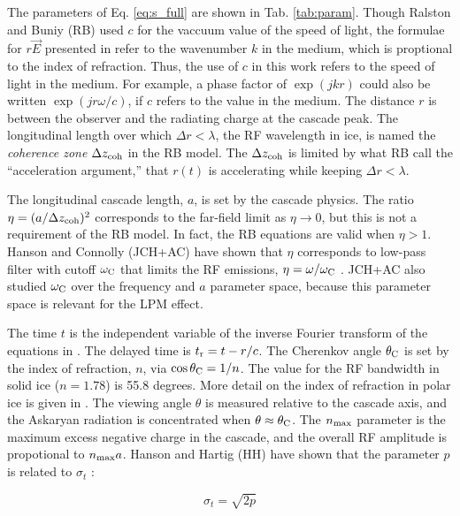 \documentclass[amsmath,amssymb,aps,prd,10pt,twocolumn,showkeys]{revtex4}
\begin{document}
\begin{itemize}
The parameters of Eq. \ref{eq:s_full} are shown in Tab. \ref{tab:param}.  Though Ralston and Buniy (RB) \cite{10.1103/physrevd.65.016003} used $c$ for the vaccuum value of the speed of light, the formulae for $r \vec{E}$ presented in \cite{10.1103/physrevd.65.016003} refer to the wavenumber $k$ in the medium, which is proptional to the index of refraction. Thus, the use of $c$ in this work refers to the speed of light in the medium.  For example, a phase factor of $\exp(j k r)$ could also be written $\exp(j r \omega/c)$, if $c$ refers to the value in the medium.  The distance $r$ is between the observer and the radiating charge at the cascade peak.  The longitudinal length over which $\Delta r < \lambda$, the RF wavelength in ice, is named the \textit{coherence zone} $\Delta z_{\rm coh}$ in the RB model.  The $\Delta z_{\rm coh}$ is limited by what RB call the ``acceleration argument,'' that $r(t)$ is accelerating while keeping $\Delta r < \lambda$.

The longitudinal cascade length, $a$, is set by the cascade physics.  The ratio $\eta = (a/\Delta z_{\rm coh})^2$ corresponds to the far-field limit as $\eta \to 0$, but this is not a requirement of the RB model.  In fact, the RB equations are valid when $\eta > 1$.  Hanson and Connolly (JCH+AC) have shown that $\eta$ corresponds to low-pass filter with cutoff $\omega_{\rm C}$ that limits the RF emissions, $\eta = \omega/\omega_{\rm C}$ \cite{10.1016/j.astropartphys.2017.03.008}.  JCH+AC also studied $\omega_{\rm C}$ over the frequency and $a$ parameter space, because this parameter space is relevant for the LPM effect.

The time $t$ is the independent variable of the inverse Fourier transform of the equations in \cite{10.1103/physrevd.65.016003}. The delayed time is $t_{\rm r} = t-r/c$.  The Cherenkov angle $\theta_{\rm C}$ is set by the index of refraction, $n$, via $\cos\theta_{\rm C} = 1/n$.  The value for the RF bandwidth in solid ice ($n=1.78$) is 55.8 degrees.  More detail on the index of refraction in polar ice is given in \cite{Barwick:2018497,ALLISON201963}.  The viewing angle $\theta$ is measured relative to the cascade axis, and the Askaryan radiation is concentrated when $\theta \approx \theta_{\rm C}$.  The $n_{\rm max}$ parameter is the maximum excess negative charge in the cascade, and the overall RF amplitude is propotional to $n_{\rm max} a$.  Hanson and Hartig (HH) have shown that the parameter $p$ is related to $\sigma_t$ \cite{PhysRevD.105.123019}:

\begin{equation}
\sigma_t = \sqrt{2p} \label{eq:pulse_width}
\end{equation}


\end{itemize}
\end{document}
